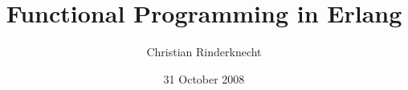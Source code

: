 
%
\usepackage[english]{babel}

%
\usepackage{amssymb,amsmath}

%
\usepackage{url,xspace}
\usepackage{graphicx}

%





%
\renewcommand{\refname}{}
\newcommand{\Prolog}{\textsf{Prolog}\xspace}
\newcommand{\Java}{\textsf{Java}\xspace}
\newcommand\Erlang{\textsf{Erlang}\xspace}
\newcommand\XSLT{\textsf{XSLT}\xspace}
\newcommand\XML{\textsf{XML}\xspace}
\newcommand\SQL{\textsf{SQL}\xspace}
\newcommand\Perl{\textsf{Perl}\xspace}
\newcommand\Python{\textsf{Python}\xspace}
\newcommand\Ruby{\textsf{Ruby}\xspace}
\newcommand\Bash{\textsf{Bash}\xspace}
\newcommand\DOS{\textsf{DOS}\xspace}
\newcommand\Unix{\textsf{Unix}\xspace}
\newcommand\Windows{\textsf{Windows}\xspace}
\newcommand\BEAM{\textsf{BEAM}\xspace}
\newcommand\ASCII{\textsf{ASCII}\xspace}

%
\title{Functional Programming in Erlang}
\author{Christian Rinderknecht}
\date{31 October 2008}



\frame{\maketitle}



